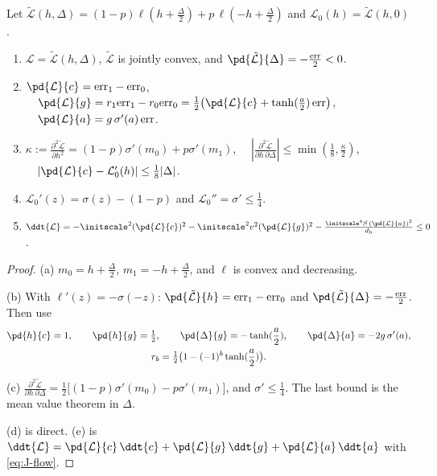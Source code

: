 \begin{lemma}[Derivatives]
\label{lem:J-geometry}
Let $\tilde{\mathcal L}( h,\Delta)=(1-p)\ell( h+\tfrac{\Delta}{2})+p\,\ell(- h+\tfrac{\Delta}{2})$ and $ \mathcal L_0( h)=\tilde{\mathcal L}( h,0)$.
\begin{enumerate}[label=(\alph*),leftmargin=*,itemsep=2pt,topsep=3pt]
\item $\mathcal L=\tilde{\mathcal L}( h,\Delta)$, $\tilde{\mathcal L}$ is jointly convex, and $\pd{\tilde{\mathcal L}}{\Delta}=-\frac{\mathrm{err}}{2}<0$.
\item $ \pd{\mathcal L}{c}=\mathrm{err}_1-\mathrm{err}_0$, $\quad \pd{\mathcal L}{g}=r_1\mathrm{err}_1-r_0\mathrm{err}_0=\tfrac{1}{2}\bigl( \pd{\mathcal L}{c}+\tanh(\frac{a}{2})\,\mathrm{err}\bigr)$, $\quad \pd{\mathcal L}{a}=g\,\sigma'(a)\,\mathrm{err}$.
\item $\kappa:=\frac{\partial^2\tilde{\mathcal L}}{\partial h^2}=(1-p)\sigma'(m_0)+p\sigma'(m_1)$, $\quad|\frac{\partial^2\tilde{\mathcal L}}{\partial h\,\partial\Delta}|\le\min(\tfrac{1}{8},\tfrac{\kappa}{2})$, $\quad| \pd{\mathcal L}{c}- \mathcal L_0'( h)|\le\tfrac{1}{8}|\Delta|$.
\item $ \mathcal L_0'(z)=\sigma(z)-(1-p)$ and $ \mathcal L_0''=\sigma'\le\tfrac{1}{4}$.
\item $\ddt{\mathcal L}=-\initscale^2( \pd{\mathcal L}{c})^2-\initscale^2v^2( \pd{\mathcal L}{g})^2-\frac{\initscale^4S\,( \pd{\mathcal L}{a})^2}{d_{\mathrm h}}\le0$.
\end{enumerate}
\end{lemma}

\begin{proof}
(a) $m_0=h+\frac{\Delta}{2}$, $m_1=-h+\frac{\Delta}{2}$, and $\ell$ is convex and decreasing.

(b) With $\ell'(z)=-\sigma(-z)$: $\pd{\tilde{\mathcal L}}{h}=\mathrm{err}_1-\mathrm{err}_0$ and $\pd{\tilde{\mathcal L}}{\Delta}=-\frac{\mathrm{err}}{2}$. Then use
\begin{gather*}
 \pd{h}{c}=1,\qquad \pd{h}{g}=\tfrac{1}{2},\qquad \pd{\Delta}{g}=-\tanh(\frac{a}{2}),\qquad \pd{\Delta}{a}=-2g\,\sigma'(a),\\
 r_b=\tfrac{1}{2}\bigl(1-(-1)^b\tanh(\frac{a}{2})\bigr).
\end{gather*}

(c) $\frac{\partial^2\tilde{\mathcal L}}{\partial h\,\partial\Delta}=\frac{1}{2}\bigl[(1-p)\sigma'(m_0)-p\sigma'(m_1)\bigr]$, and $\sigma'\le\frac{1}{4}$. The last bound is the mean value theorem in $\Delta$.

(d) is direct. (e) is $\ddt{\mathcal L}= \pd{\mathcal L}{c}\,\ddt{c}+ \pd{\mathcal L}{g}\,\ddt{g}+ \pd{\mathcal L}{a}\,\ddt{a}$ with \cref{eq:J-flow}.
\end{proof}


